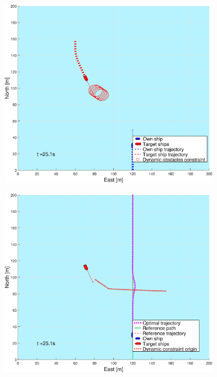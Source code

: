 \begin{figure}[ht!] %
    \begin{subfigure}[b]{0.494\textwidth}
        \centering
        \includegraphics[width=\textwidth]{Images/Figures/sving_SO/_Simple_0fig1_time=25}
        \subcaption{}
    \end{subfigure}
    \hfill
    \begin{subfigure}[b]{0.494\textwidth}
        \centering
        \includegraphics[width=\textwidth]{Images/Figures/sving_SO/_Simple_0fig999_time=25}

\end{subfigure}
\end{figure}
